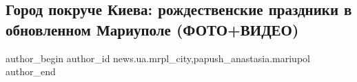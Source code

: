  
 
 
 
 
 
\subsection{Город покруче Киева: рождественские праздники в обновленном Мариуполе (ФОТО+ВИДЕО)}
\label{sec:21_12_2018.stz.news.ua.mrpl_city.2.gorod_pokruche_kieva}
 
\ifcmt
 author_begin
   author_id news.ua.mrpl_city,papush_anastasia.mariupol
 author_end
\fi
